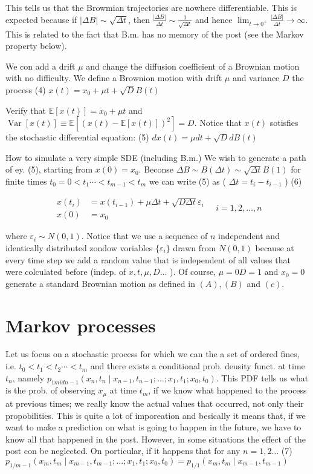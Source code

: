 This tells us that the Browmian trajectories are nowhere differentiable. This is expected because if $|
\Delta B| \sim \sqrt{\Delta t}$, then $\frac{|
\Delta B|}{\Delta t} \sim \frac{1}{\sqrt{\Delta t}}$ and hence $\lim _{t \rightarrow 0^{+}} \frac{|
\Delta B|}{\Delta t} \rightarrow \infty$.
This is related to the fact that B.m. has no memory of the post (see the Markov property below).

We con add a drift $\mu$ and change the diffusion coefficient of a Brownian motion with no difficulty. We define a Brownion motion with drift $\mu$ and variance $D$ the process
(4) $x(t)=x_{0}+\mu t+\sqrt{D} B(t)$

Verify that $\mathbb{E}[x(t)]=x_{0}+\mu t$ and $\operatorname{Var}[x(t)] \equiv \mathbb{E}
\left[(x(t)-\mathbb{E}[x(t)])^{2}\right]=D$. Notice that $x(t)$ sotisfies the stochastic differential equation:
(5) $d x(t)=\mu d t+\sqrt{D} d B(t)$

How to simulate a very simple SDE (including B.m.) We wish to generate a path of ey. (5), starting from $x(0)=x_{0}$. Beconse $\Delta B \sim B(\Delta t) \sim \sqrt{\Delta t} B(1)$ for finite times $t_{0}=0<t_{1} \cdots <t_{m-1}<t_{m}$ we can write (5) as ( $\Delta t=t_{i}-t_{i-1}$ )
(6)

$$ \begin{aligned}
x\left(t_{i}\right) & =x\left(t_{i-1}\right)+\mu \Delta t+\sqrt{D \Delta t} \varepsilon_{i} \\
x(0) & =x_{0}
\end{aligned} \quad i=1,2, \ldots, n $$

where $\varepsilon_{i} \sim N(0,1)$. Notice that we use a sequence of $n$ independent and identically distributed zondow voriables $\{\varepsilon_{i}\}$ drawn from $N(0,1)$ because at every time step we add a random value that is independent of all values that were colculated before (indep. of $x, t, \mu, D \ldots$ ). Of course, $\mu=0 D=1$ and $x_{0}=0$ generate a standard Brownian motion as defined in $(A),(B)$ and $(c)$.

\section*{Markov processes}
Let us focus on a stochastic process for which we can the a set of ordered fines, i.e. $t_{0}<t_{1}<t_{2} \cdots<t_{m}$ and there exists a conditional prob. deusity funct. at time $t_{n}$, namely $p_{1 
mid n-1}
\left(x_{n}, t_{n} \mid x_{n-1}, t_{n-1} ; \ldots ; x_{1}, t_{1} ; x_{0}, t_{0}\right)$.
This PDF tells us what is the prob. of observing $x_{\mu}$ at time $t_{m}$, if we know what happened to the process at previous times; we really know the actual values that occurred, not only their propobilities. This is quite a lot of imporeation and besically it means that, if we want to make a prediction on what is going to happen in the future, we have to know all that happened in the post. However, in some situations the effect of the post con be neglected. On porticular, if it happens that for any $n=1,2 \ldots$
(7) $p_{1 / m-1}
\left(x_{m}, t_{m} \mid x_{m-1}, t_{m-1} ; \ldots ; x_{1}, t_{1} ; x_{0}, t_{0}\right)=p_{1 / 1}
\left(x_{m}, t_{m} \mid x_{m-1}, t_{m-1}\right)$

